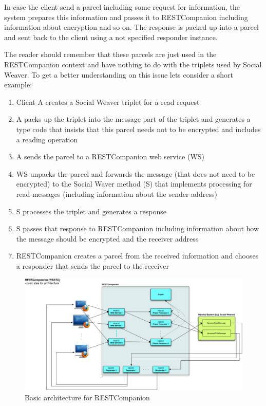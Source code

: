 In case the client send a parcel including some request for information, the system prepares this information and passes it to RESTCompanion including information about encryption and so on. The response is packed up into a parcel and sent back to the client using a not specified responder instance. 

The reader should remember that these parcels are just used in the RESTCompanion context and have nothing to do with the triplets used by Social Weaver. To get a better understanding on this issue lets consider a short example:

\begin{enumerate}
\item Client A creates a Social Weaver triplet for a read request
\item A packs up the triplet into the message part of the triplet and generates a type code that insists that this parcel needs not to be encrypted and includes a reading operation
\item A sends the parcel to a RESTCompanion web service (WS)
\item WS unpacks the parcel and forwards the message (that does not need to be encrypted) to the Social Waver method (S) that implements processing for read-messages (including information about the sender address)
\item S processes the triplet and generates a response
\item S passes that response to RESTCompanion including information about how the message should be encrypted  and the receiver address
\item RESTCompanion creates a parcel from the received information and chooses a responder that sends the parcel to the receiver
\end{enumerate}


\begin{figure}[h!] \centering
		\includegraphics[width=13cm]{images/restcompanion-basic-architecture.png}
		\caption{Basic architecture for RESTCompanion}
\end{figure} 

